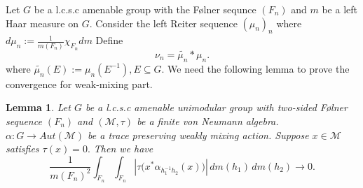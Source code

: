 \documentclass[11pt]{amsart}
\newtheorem{lem}[thm]{Lemma}
\theoremstyle{definition}
\theoremstyle{myremark}
\numberwithin{equation}{section}
\begin{document}
Let $G$ be a l.c.s.c amenable group with the F\o lner sequnce $(F_n)$ and $m$ be a left Haar measure on $G.$
Consider the left Reiter sequence $(\mu_n)_n$ where $d\mu_n:= \frac{1}{m(F_n)}\chi_{F_n}dm$
Define $$\nu_n=\widetilde{\mu_n}*\mu_n.$$ where $\widetilde{\mu_n}(E):= \mu_n(E^{-1}), E \subseteq G.$ We need the following lemma to prove the convergence for weak-mixing part.
 \begin{lem}\label{lemma_Reiter}
   Let $G$ be a l.c.s.c amenable unimodular group with two-sided F\o lner sequence $(F_n)$ and $(\mathcal{M},\tau)$ be a finite von Neumann algebra. $\alpha: G \to Aut(\mathcal{M})$ be a trace preserving weakly mixing action. Suppose $x \in \mathcal{M}$ satisfies $\tau(x)=0.$ Then we have 
   $$\frac{1}{m(F_n)^2}
\int_{F_n}\int_{F_n}
\left|
\tau\bigl(x^*\alpha_{h_1^{-1}h_2}(x)\bigr)
\right|
\,dm(h_1)\,dm(h_2)
\longrightarrow0.$$
 \end{lem}
\end{document}
